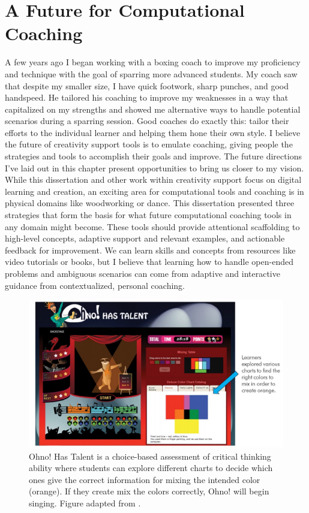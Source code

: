 \section{A Future for Computational Coaching}
A few years ago I began working with a boxing coach to improve my proficiency and technique with the goal of sparring more advanced students. My coach saw that despite my smaller size, I have quick footwork, sharp punches, and good handspeed. He tailored his coaching to improve my weaknesses in a way that capitalized on my strengths and showed me alternative ways to handle potential scenarios during a sparring session. Good coaches do exactly this: tailor their efforts to the individual learner and helping them hone their own style. I believe the future of creativity support tools is to emulate coaching, giving people the strategies and tools to accomplish their goals and improve. The future directions I've laid out in this chapter present opportunities to bring us closer to my vision. While this dissertation and other work within creativity support focus on digital learning and creation, an exciting area for computational tools and coaching is in physical domains like woodworking or dance. This dissertation presented three strategies that form the basis for what future computational coaching tools in any domain might become. These tools should provide attentional scaffolding to high-level concepts, adaptive support and relevant examples, and actionable feedback for improvement. We can learn skills and concepts from resources like video tutorials or books, but I believe that learning how to handle open-ended problems and ambiguous scenarios can come from adaptive and interactive guidance from contextualized, personal coaching.

\begin{figure}
\centering
  \includegraphics[width=.9\textwidth]{i_figures/choicelet.jpg}
  \caption{Ohno! Has Talent is a choice-based assessment of critical thinking ability where students can explore different charts to decide which ones give the correct information for mixing the intended color (orange). If they create mix the colors correctly, Ohno! will begin singing. Figure adapted from \cite{schwartz2013measuring}.
}
  \label{fig:choicelet}
\end{figure}

